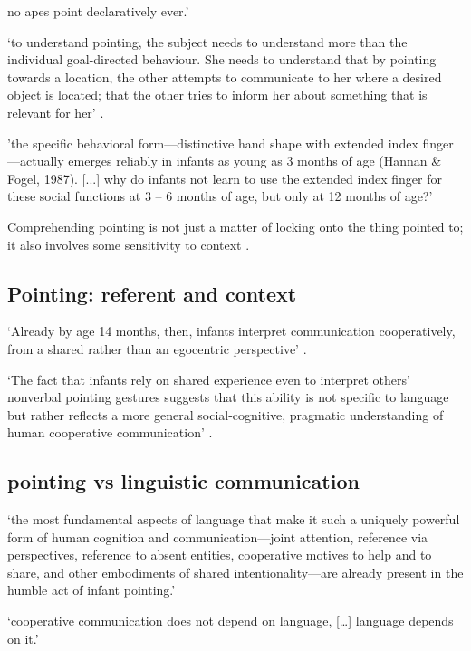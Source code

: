 \documentclass[12pt]{extarticle}
\begin{document}
\begin{multicols}{3}
no apes point declaratively ever.’
\citep[p.\ 510]{Tomasello:2010dy}
 
‘to understand pointing, the subject needs to understand more than the individual goal-directed behaviour. She needs to understand that by pointing towards a location, the other attempts to communicate to her where a desired object is located; that the other tries to inform her about something that is relevant for her’
\citep[p.\ 6]{Moll:2007gu}.
 
'the specific behavioral form---distinctive hand shape with extended index finger---actually emerges reliably in infants as young as 3 months of age (Hannan \& Fogel, 1987). [...] why do infants not learn to use the extended index finger for these social functions at 3 – 6 months of age, but only at 12 months of age?' \citep[p.\ 716]{Tomasello:2007fi}
 
Comprehending pointing is not just a matter of locking onto the thing pointed to; it also involves some sensitivity to context \citep[see][]{Liebal:2010lr}.
 
\subsection{Pointing: referent and context}
 
‘Already by age 14 months, then, infants interpret communication cooperatively, from a shared rather than an egocentric perspective’ \citep[p.\ 269]{Liebal:2010lr}.
 
‘The fact that infants rely on shared experience even to interpret others’ nonverbal pointing gestures suggests that this ability is not specific to language but rather reflects a more general social-cognitive, pragmatic understanding of human cooperative communication’ \citep[p.\ 270]{Liebal:2010lr}.
 
\subsection{pointing vs linguistic communication}
 
‘the most fundamental aspects of language that make it such a uniquely powerful form of human cognition and communication---joint attention, reference via perspectives, reference to absent entities, cooperative motives to help and to share, and other embodiments of shared intentionality---are already present in the humble act of infant pointing.’ \citep[p.\ 719]{Tomasello:2007fi}
 
‘cooperative communication does not depend on language, […] language depends on it.’ \citep[p.\ 720]{Tomasello:2007fi}
 

\end{multicols}
\end{document}
